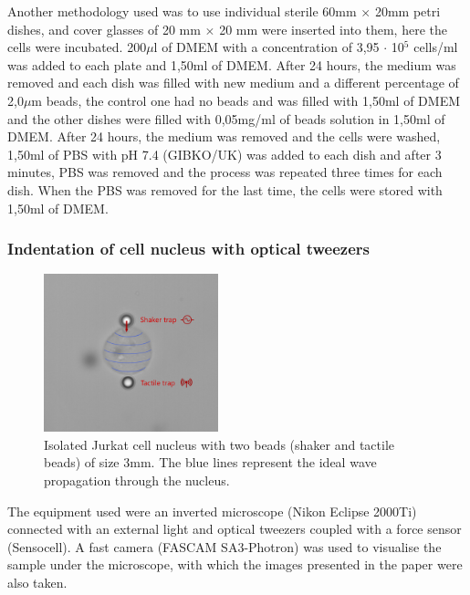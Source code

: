 \documentclass[12pt, a4paper]{article} %
\begin{document}
	Another methodology used was to use individual sterile 60mm $\times$ 20mm petri dishes, and cover glasses of 20 mm $\times$ 20 mm were inserted into them, here the cells were incubated. 200$\mu$l of DMEM with a concentration of 3,95 $\cdot$ 10$^{5}$ cells/ml was added to each plate and 1,50ml of DMEM. After 24 hours, the medium was removed and each dish was filled with new medium and a different percentage of 2,0$\mu$m beads, the control one had no beads and was filled with 1,50ml of DMEM and the other dishes were filled with 0,05mg/ml of beads solution in 1,50ml of DMEM. After 24 hours, the medium was removed and the cells were washed, 1,50ml of PBS with pH 7.4 (GIBKO/UK) was added to each dish and after 3 minutes, PBS was removed and the process was repeated three times for each dish. When the PBS was removed for the last time, the cells were stored with 1,50ml of DMEM. 
	
	\setlength{\parskip}{0mm}
	
	\subsubsection{Indentation of cell nucleus with optical tweezers}
	
	\begin{figure}
		\centering
		\includegraphics[width=0.45\textwidth]{figures/jurkat_nucleus_waves.png}
		\caption{Isolated Jurkat cell nucleus with two beads (shaker and tactile beads) of size 3mm. The blue lines represent the ideal wave propagation through the nucleus.}
		\label{fig:myfig2}
	\end{figure}
	
	The equipment used were an inverted microscope (Nikon Eclipse 2000Ti) connected with an external light and optical tweezers coupled with a force sensor (Sensocell). A fast camera (FASCAM SA3-Photron) was used to visualise the sample under the microscope, with which the images presented in the paper were also taken.
	
\end{document}
